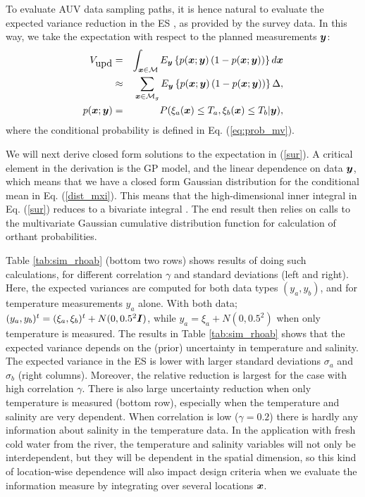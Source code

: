 \documentclass[aoas]{imsart}
\begin{document}
To evaluate AUV data sampling paths, it is hence natural to evaluate the expected variance reduction in the ES  \citep{chevalier2014fast}, as provided by the survey data. In this way, we take the expectation with respect to the planned measurements ${\boldsymbol y}$:
\begin{eqnarray}\label{sur}
    V_{\mbox{upd}} &=& \int_{\bx \in \mathcal{M}} E_{\by} \left\{ p(\bx;\by)\left( 1-p(\bx;\by)\right) \right\} d\bx \\
    & \approx & \sum_{\bx \in \mathcal{M}_g} E_{\by} \left\{ p(\bx;\by)\left( 1-p(\bx;\by)\right) \right\} \Delta, \nonumber \\
    p(\bx;\by) &=& P(\xi_a(\bx) \leq T_a, \xi_b(\bx) \leq T_b |\by), \nonumber
\end{eqnarray}
where the conditional probability is defined in Eq. (\ref{eq:prob_mv}).

We will next derive closed form solutions to the expectation in (\ref{sur}). A critical
element in the derivation is the GP model, and the linear dependence on data ${\boldsymbol y}$, which means that we have a closed form Gaussian distribution for the conditional mean in Eq. (\ref{dist_mxi}). This means that the high-dimensional inner integral in Eq. (\ref{sur}) reduces to a bivariate integral \citep{bhattacharjya2013value, chevalier2014fast}. The end result then relies on calls to the multivariate Gaussian cumulative distribution function for calculation of orthant probabilities. 

Table \ref{tab:sim_rhoab} (bottom two rows) shows results of doing such calculations, for different correlation $\gamma$ and standard deviations (left and right). Here, the expected variances are computed for both data types $(y_a,y_b)$, and for temperature measurements $y_a$ alone. With both data; $(y_a,y_b)^t=(\xi_a,\xi_b)^t+N(0,0.5^2{\boldsymbol I})$, while $y_a=\xi_a+N(0,0.5^2)$ when only temperature is measured.
The results in Table \ref{tab:sim_rhoab} shows that 
the expected variance depends on the (prior) uncertainty in temperature and salinity. The expected variance in the ES is lower with larger standard deviations $\sigma_a$ and $\sigma_b$ (right columns). Moreover, the relative reduction is largest for the case with high correlation $\gamma$. There is also large uncertainty reduction when only temperature is measured (bottom row), especially when the temperature and salinity are very dependent. When correlation is low ($\gamma=0.2$) there is hardly any information about salinity in the temperature data. In the application with fresh cold water from the river, the temperature and salinity variables will not only be interdependent, but they will be dependent in the spatial dimension, so this kind of location-wise dependence will also impact design criteria when we evaluate the information measure by integrating over several locations ${\boldsymbol x}$. 
\end{document}
